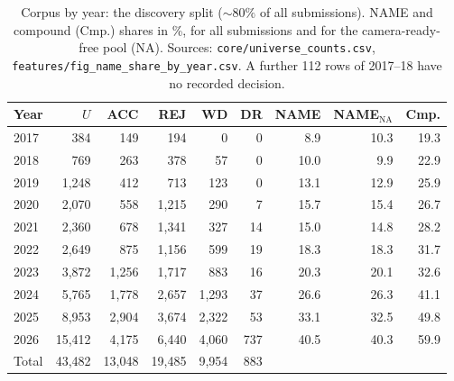 \begin{table}[t]
\centering
\scriptsize
\setlength{\tabcolsep}{2.2pt}
\caption{Corpus by year: the discovery split (${\sim}80\%$ of all submissions). NAME and compound (Cmp.) shares in \%, for all submissions and for the camera-ready-free pool (NA). Sources: \texttt{core/universe\_counts.csv}, \texttt{features/fig\_name\_share\_by\_year.csv}. A further 112 rows of 2017--18 have no recorded decision.}
\label{tab:nt-corpus}
\begin{tabular}{lrrrrrrrr}
\toprule
Year & $U$ & ACC & REJ & WD & DR & NAME & NAME$_{\text{NA}}$ & Cmp. \\
\midrule
2017 & 384 & 149 & 194 & 0 & 0 & 8.9 & 10.3 & 19.3 \\
2018 & 769 & 263 & 378 & 57 & 0 & 10.0 & 9.9 & 22.9 \\
2019 & 1,248 & 412 & 713 & 123 & 0 & 13.1 & 12.9 & 25.9 \\
2020 & 2,070 & 558 & 1,215 & 290 & 7 & 15.7 & 15.4 & 26.7 \\
2021 & 2,360 & 678 & 1,341 & 327 & 14 & 15.0 & 14.8 & 28.2 \\
2022 & 2,649 & 875 & 1,156 & 599 & 19 & 18.3 & 18.3 & 31.7 \\
2023 & 3,872 & 1,256 & 1,717 & 883 & 16 & 20.3 & 20.1 & 32.6 \\
2024 & 5,765 & 1,778 & 2,657 & 1,293 & 37 & 26.6 & 26.3 & 41.1 \\
2025 & 8,953 & 2,904 & 3,674 & 2,322 & 53 & 33.1 & 32.5 & 49.8 \\
2026 & 15,412 & 4,175 & 6,440 & 4,060 & 737 & 40.5 & 40.3 & 59.9 \\
\midrule
Total & 43,482 & 13,048 & 19,485 & 9,954 & 883 & & & \\
\bottomrule
\end{tabular}
\end{table}

